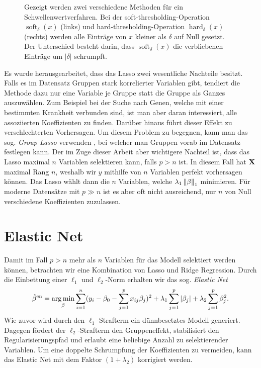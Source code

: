\begin{figure}
\begin{subfigure}{0.4\textwidth}
	\label{soft_thresholding}
	\end{subfigure}
\caption{Gezeigt werden zwei verschiedene Methoden für ein Schwellenwertverfahren. Bei der soft-thresholding-Operation $\operatorname{soft}_{\delta}(x)$ (links) und hard-thresholding-Operation $\operatorname{hard}_{\delta}(x)$ (rechts) werden alle Einträge von $x$ kleiner als $\delta$ auf Null gesetzt. Der Unterschied besteht darin, dass $\operatorname{soft}_{\delta}(x)$ die verbliebenen Einträge um $|\delta|$ schrumpft.}
\label{thresholding_figure}
\end{figure}

Es wurde herausgearbeitet, dass das Lasso zwei wesentliche Nachteile besitzt. Falls es im Datensatz Gruppen stark korrelierter Variablen gibt, tendiert die Methode dazu nur eine Variable je Gruppe statt die Gruppe als Ganzes auszuwählen. Zum Beispiel bei der Suche nach Genen, welche mit einer bestimmten Krankheit verbunden sind, ist man aber daran interessiert, alle assoziierten Koeffizienten zu finden. Darüber hinaus führt dieser Effekt zu verschlechterten Vorhersagen. Um diesem Problem zu begegnen, kann man das sog. \textit{Group Lasso} verwenden \cite{yuan}, bei welcher man Gruppen vorab im Datensatz festlegen kann. Der im Zuge dieser Arbeit aber wichtigere Nachteil ist, dass das Lasso maximal $n$ Variablen selektieren kann, falls $p > n$ ist. In diesem Fall hat $\mathbf{X}$ maximal Rang $n$, weshalb wir $y$ mithilfe von $n$ Variablen perfekt vorhersagen können. Das Lasso wählt dann die $n$ Variablen, welche $\lambda_1\left\lVert \beta \right\rVert_1$ minimieren. Für moderne Datensätze mit $p \gg n$ ist es aber oft nicht ausreichend, nur $n$ von Null verschiedene Koeffizienten zuzulassen.




\section{Elastic Net}
\label{elastic_net}

Damit im Fall $p > n$ mehr als $n$ Variablen für das Modell selektiert werden können, betrachten wir eine Kombination von Lasso und Ridge Regression. Durch die Einbettung einer $\ell_1$ und $\ell_2$-Norm erhalten wir das sog. \textit{Elastic Net} \cite{zou_elasticnet}
\begin{align}
\label{elastic_net_formulation}
\hat{\beta}^{\text{en}} = \operatorname*{arg\,min}_{\beta} \sum_{i=1}^{n}(y_i - \beta_0 - \sum_{j=1}^p x_{ij}\beta_j)^2 + \lambda_1\sum_{j=1}^p \left|\beta_j\right| + \lambda_2\sum_{j=1}^p \beta_j^2.
\end{align}
Wie zuvor wird durch den $\ell_1$-Strafterm ein dünnbesetztes Modell generiert. Dagegen fördert der $\ell_2$-Strafterm den Gruppeneffekt, stabilisiert den Regularisierungspfad und erlaubt eine beliebige Anzahl zu selektierender Variablen. Um eine doppelte Schrumpfung der Koeffizienten zu vermeiden, kann das Elastic Net mit dem Faktor $(1 + \lambda_2)$ korrigiert werden. 

